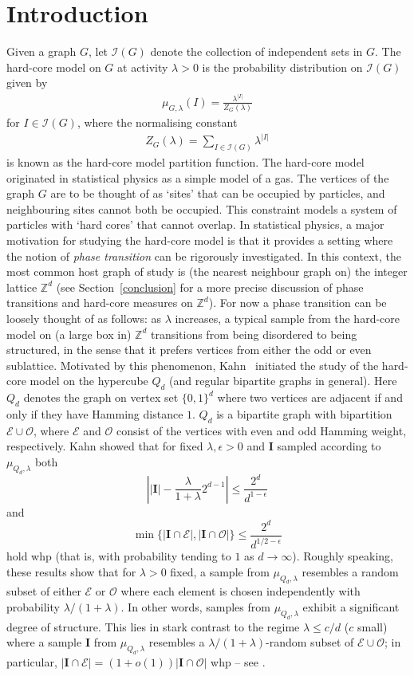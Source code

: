 \documentclass[10pt,a4paper]{amsart}
\theoremstyle{definition}
\newcommand{\cO}{\mathcal{O} }
\newcommand{\cE}{\mathcal{E} }
\newcommand{\eps}{\epsilon}
\newcommand{\0}[0]{\emptyset}
\newcommand{\lam}{\lambda}
\begin{document}
\section{Introduction}
Given a graph $G$, let $\mathcal{I}(G)$ denote the collection of independent sets in $G$.
 The hard-core model on $G$ at activity $\lambda>0$ is the probability distribution on $\mathcal I(G)$ given by
 \begin{align}\label{eqHCUnidef}
 \mu_{G,\lambda}(I)=\frac{\lambda^{|I|}}{Z_G(\lambda)}
 \end{align}
for $I\in \mathcal{I}(G)$, where the normalising constant
 \begin{align}\label{eqHCPartdef}
Z_G(\lambda)= \sum_{I\in \mathcal{I}(G)}\lambda^{|I|}
\end{align}
is known as the hard-core model partition function. 
The hard-core model originated in statistical physics as a simple model of a gas. 
The vertices of the graph $G$ are to be thought of as `sites' that can be occupied by particles, and neighbouring sites cannot both be occupied.  
This constraint models a system of particles with `hard cores' that cannot overlap. In statistical physics, a major motivation for studying the hard-core model is that it provides a setting where the notion of \emph{phase transition} can be rigorously investigated. In this context, the most common host graph of study is (the nearest neighbour graph on) the integer lattice $\mathbb Z^d$ (see Section~\ref{conclusion} for a more precise discussion of phase transitions and hard-core measures on $\mathbb Z^d$). For now a phase transition can be loosely thought of as follows: as $\lam$ increases, a typical sample from the hard-core model on (a large box in) $\mathbb Z^d$ transitions from being disordered to being structured, in the sense that it prefers vertices from either the odd or even sublattice. 
Motivated by this phenomenon, Kahn~\cite{kahn2001entropy} initiated the study of the hard-core model on the hypercube $Q_d$ (and regular bipartite graphs in general). Here $Q_d$ denotes the graph on vertex set $\{0,1\}^d$ where two vertices are adjacent if and only if they have Hamming distance $1$. $Q_d$ is a bipartite graph with bipartition $\cE \cup \cO$, where $\cE$ {and} $\cO$ consist of the vertices with even {and} odd Hamming weight, respectively. Kahn showed that for fixed $\lam, \eps>0$ and $\mathbf I$ sampled according to $\mu_{Q_d,\lam}$ both
\[
\left||\mathbf I| - \frac{\lam}{1+\lam}2^{d-1} \right|\leq \frac{2^d}{d^{1-\eps}}
\]
and 
\[
\min\{|\mathbf I \cap \cE|, |\mathbf I \cap \cO |\}\leq  \frac{2^d}{d^{1/2-\eps}}
\]
hold whp (that is, with probability tending to $1$ as $d\to\infty$). Roughly speaking, these results show that for $\lam>0$ fixed, a sample from $\mu_{Q_d,\lam}$ resembles a random subset of either $\cE$ or $\cO$ where each element is chosen independently with probability $\lam/(1+\lam)$. In other words, samples from $\mu_{Q_d,\lam}$ exhibit a significant degree of structure. This lies in stark contrast to the regime $\lam\leq c/d$ ($c$ small) where a sample $\mathbf I$ from $\mu_{Q_d,\lam}$ resembles a $\lam/(1+\lam)$-random subset of $\cE \cup \cO$; in particular, $|\mathbf I \cap \cE|=(1+o(1))|\mathbf I \cap \cO|$ whp -- see \cite{weitz}.
\end{document}
